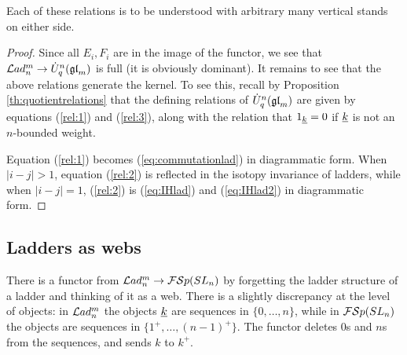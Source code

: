 \documentclass[11pt,leqno]{article}
\begin{document}
Each of these relations is to be understood with arbitrary many vertical stands on either side.

\begin{proof}
Since all $ E_i, F_i $ are in the image of the functor, we see that $ \mathcal{L}ad_n^m \rightarrow \dot{{{U}}}_q^n({\mathfrak{gl}}_m) $ is full (it is obviously dominant).  It remains to see that the above relations generate the kernel.  To see this, recall by Proposition \ref{th:quotientrelations} that the defining relations of $ \dot{{{U}}}_q^n({\mathfrak{gl}}_m) $ are given by equations (\ref{rel:1}) and (\ref{rel:3}), along with the relation that $ 1_{{\underline{k}}} = 0 $ if $ {\underline{k}} $ is not an $ n$-bounded weight.
 
Equation (\ref{rel:1}) becomes (\ref{eq:commutationlad}) in diagrammatic form.  When $ |i-j| > 1 $, equation (\ref{rel:2}) is reflected in the isotopy invariance of ladders, while when $ |i-j |= 1$, (\ref{rel:2}) is (\ref{eq:IHlad}) and (\ref{eq:IHlad2}) in diagrammatic form. 
\end{proof}

\subsection{Ladders as webs}\label{sec:psi}
There is a functor from $ \mathcal{L}ad_n^m \rightarrow {\mathcal{FS}p}(SL_n)$  by forgetting the ladder structure of a ladder and thinking of it as a web. There is a slightly discrepancy at the level of objects: in $\mathcal{L}ad_n^m$ the objects ${\underline{k}}$ are sequences in $\{0,\ldots,n\}$, while in ${\mathcal{FS}p}(SL_n)$ the objects are sequences in $\{1^+,\ldots,(n-1)^+\}$. The functor deletes $0$s and $n$s from the sequences, and sends $k$ to $k^+$.
\end{document}

